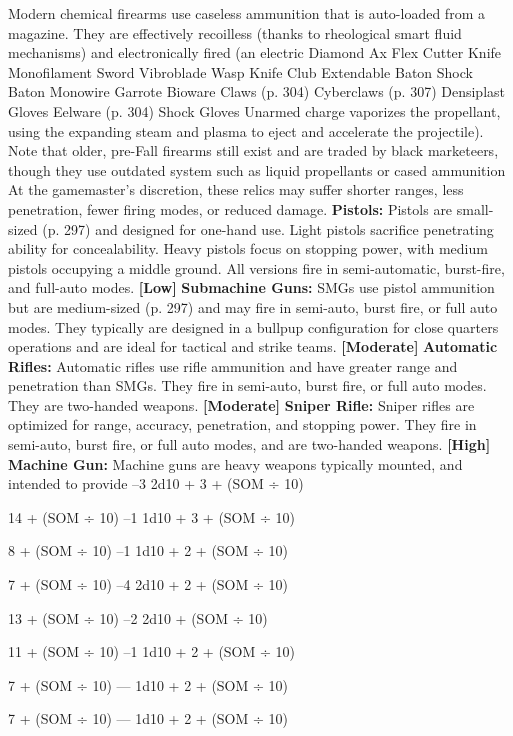 Modern chemical firearms use caseless ammunition 
that is auto-loaded from a magazine. They are effectively
recoilless (thanks to rheological smart fluid
mechanisms) and electronically fired (an electric 
Diamond Ax
Flex Cutter
Knife
Monofilament Sword
Vibroblade
Wasp Knife
Club
Extendable Baton
Shock Baton
Monowire Garrote
Bioware Claws (p. 304)
Cyberclaws (p. 307)
Densiplast Gloves
Eelware (p. 304)
Shock Gloves
Unarmed
charge vaporizes the propellant, using the expanding 
steam and plasma to eject and accelerate the projectile).
Note that older, pre-Fall firearms still exist and are 
traded by black marketeers, though they use outdated 
system such as liquid propellants or cased ammunition
At the gamemaster's discretion, these relics may
suffer shorter ranges, less penetration, fewer firing 
modes, or reduced damage.
\textbf{Pistols:} Pistols are small-sized (p. 297) and designed
for one-hand use. Light pistols sacrifice penetrating
ability for concealability. Heavy pistols focus
on stopping power, with medium pistols occupying 
a middle ground. All versions fire in semi-automatic, 
burst-fire, and full-auto modes. \textbf{[Low]}
\textbf{Submachine Guns:} SMGs use pistol ammunition
but are medium-sized (p. 297) and may fire in
semi-auto, burst fire, or full auto modes. They typically
are designed in a bullpup configuration for
close quarters operations and are ideal for tactical 
and strike teams. \textbf{[Moderate]}
\textbf{Automatic Rifles:} Automatic rifles use rifle ammunition
and have greater range and penetration than
SMGs. They fire in semi-auto, burst fire, or full auto 
modes. They are two-handed weapons. \textbf{[Moderate]}
\textbf{Sniper Rifle:} Sniper rifles are optimized for range, 
accuracy, penetration, and stopping power. They fire 
in semi-auto, burst fire, or full auto modes, and are 
two-handed weapons. \textbf{[High]}
\textbf{Machine Gun:} Machine guns are heavy weapons
typically mounted, and intended to provide
–3
2d10 + 3 + (SOM ÷ 10) 

14 + (SOM ÷ 10)
–1
1d10 + 3 + (SOM ÷ 10) 

8 + (SOM ÷ 10)
–1
1d10 + 2 + (SOM ÷ 10) 

7 + (SOM ÷ 10)
–4
2d10 + 2 + (SOM ÷ 10)

13 + (SOM ÷ 10)
–2
2d10 + (SOM ÷ 10) 

11 + (SOM ÷ 10)
–1
1d10 + 2 + (SOM ÷ 10) 

7 + (SOM ÷ 10)
—
1d10 + 2 + (SOM ÷ 10) 

7 + (SOM ÷ 10)
—
1d10 + 2 + (SOM ÷ 10) 

